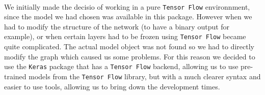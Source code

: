 \documentclass[11 pt]{article}
\begin{document}
\paragraph{} We initially made the decisio of working in a pure \texttt{Tensor Flow} environnment, since the model we had chosen was available in this package. However when we had to modify the structure of the network (to have a binary output for example), or when certain layers had to be frozen using \texttt{Tensor Flow} became quite complicated. The actual model object was not found so we had to directly modify the graph which caused us some problems. For this reason we decided to use the \texttt{Keras} package that has a \texttt{Tensor Flow} backend, allowing us to use pre-trained models from the \texttt{Tensor Flow} library, but with a much clearer syntax and easier to use tools, allowing us to bring down the development times. 

\end{document}
